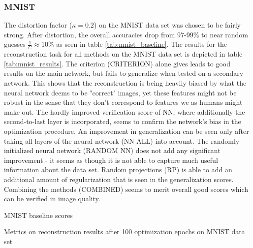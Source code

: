 \subsubsection{MNIST}


The distortion factor ($\kappa = 0.2$) on the MNIST data set was chosen to be fairly strong.
After distortion, the overall accuracies drop from 97-99\% to near random guesses $\frac 1 C \approx 10\%$
as seen in table \ref{tab:mnist_baseline}.
The results for the reconstruction task for all methods on the MNIST data set is depicted in table \ref{tab:mnist_results}.
The criterion (CRITERION) alone gives leads to good results on the main network, but fails to generalize when tested on a secondary network.
This shows that the reconstruction is being heavily biased by what the neural network deems to be "correct" images, 
yet these features might not be robust in the sense that they don't correspond to features we as humans might make out.
The hardly improved verification score of NN, where additionally the second-to-last layer is 
incorporated, seems to confirm
the network's bias in the optimization procedure. 
An improvement in generalization can be seen only after taking 
all layers of the neural network (NN ALL) into account.
The randomly initialized neural network (RANDOM NN) does not add any significant improvement - 
it seems as though it is not able to capture much useful information about the data set.
Random projections (RP) is able to add an additional amount of regularization that is seen in the generalization scores.
Combining the methods (COMBINED) seems to merit overall good scores which can be verified in image quality.


\begin{table}[!htbp]
\centering
\footnotesize
{}
\caption{MNIST baseline scores}
\label{tab:mnist_baseline}
\end{table}

\begin{table}[!htbp]
\centering
\footnotesize
{}
\caption{Metrics on reconstruction results after 100 optimization epochs on MNIST data set}
\label{tab:mnist_results}
\end{table}


